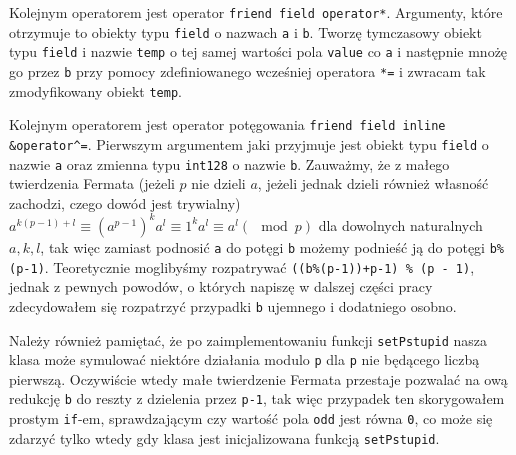 \documentclass{article}
\begin{document}
Kolejnym operatorem jest operator \texttt{friend field operator*}. Argumenty, które otrzymuje
to obiekty typu \texttt{field} o nazwach \texttt{a} i \texttt{b}. Tworzę tymczasowy obiekt typu \texttt{field} i nazwie \texttt{temp}
o tej samej wartości pola \texttt{value} co \texttt{a} i następnie mnożę go przez \texttt{b} przy pomocy
zdefiniowanego wcześniej operatora \texttt{*=} i zwracam tak zmodyfikowany obiekt \texttt{temp}.

Kolejnym operatorem jest operator potęgowania \texttt{friend field inline \&operator}\verb!^!\texttt{=}. 
Pierwszym argumentem jaki przyjmuje jest obiekt typu \texttt{field} o nazwie \texttt{a} oraz zmienna typu 
\texttt{\textunderscore \textunderscore int128} o
nazwie \texttt{b}. Zauważmy, że z małego twierdzenia Fermata (jeżeli $p$ nie dzieli $a$, jeżeli jednak dzieli również własność zachodzi, 
czego dowód jest trywialny) $a^{k(p-1)+l} \equiv (a^{p-1})^ka^l \equiv 1^ka^l \equiv a^l (\mod p)$ dla dowolnych naturalnych
$a,k,l$, tak więc
zamiast podnosić \texttt{a} do potęgi \texttt{b} możemy podnieść ją do potęgi \texttt{b\%(p-1)}.
Teoretycznie moglibyśmy rozpatrywać \texttt{((b\%(p-1))+p-1) \% (p - 1)}, jednak z pewnych powodów, o 
których napiszę w dalszej części pracy zdecydowałem się rozpatrzyć przypadki \texttt{b} ujemnego i 
dodatniego osobno. 

Należy również pamiętać, że po zaimplementowaniu funkcji \texttt{setPstupid}
nasza klasa może symulować niektóre działania modulo \texttt{p} dla \texttt{p}
nie będącego liczbą pierwszą. Oczywiście wtedy małe twierdzenie Fermata
przestaje pozwalać na ową redukcję \texttt{b} do reszty z dzielenia przez
\texttt{p-1}, tak więc przypadek ten skorygowałem prostym \texttt{if}-em, sprawdzającym 
czy wartość pola \texttt{odd} jest równa \texttt{0}, co może się zdarzyć tylko wtedy gdy klasa 
jest inicjalizowana funkcją \texttt{setPstupid}.
\end{document}
